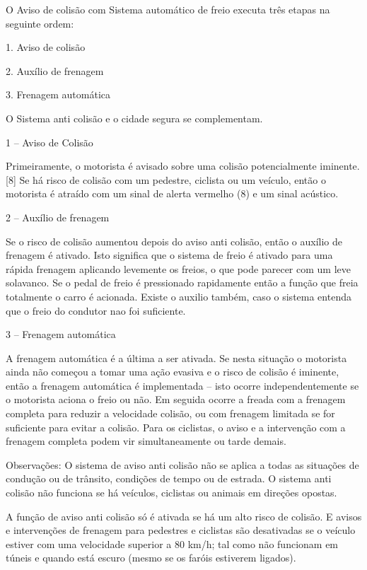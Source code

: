 O Aviso de colisão com Sistema automático de freio executa três etapas na seguinte ordem:

1. Aviso de colisão

2. Auxílio de frenagem

3. Frenagem automática

O Sistema anti colisão e o cidade segura se complementam.

1 – Aviso de Colisão

Primeiramente, o motorista é avisado sobre uma colisão potencialmente iminente.
[8] Se há risco de colisão com um pedestre, ciclista ou um veículo, então o
motorista é atraído com um sinal de alerta vermelho (8) e um sinal acústico. \cite{8comper}

2 – Auxílio de frenagem

Se o risco de colisão aumentou depois do aviso anti colisão, então o auxílio de
frenagem é ativado. Isto significa que o sistema de freio é ativado para uma
rápida frenagem aplicando levemente os freios, o que pode parecer com um leve
solavanco. Se o pedal de freio é pressionado rapidamente então a função que
freia totalmente o carro é acionada. Existe o auxilio também, caso o sistema
entenda que o freio do condutor nao foi suficiente. \cite{8comper}

3 – Frenagem automática

A frenagem automática é a última a ser ativada. Se nesta situação o motorista
ainda não começou a tomar uma ação evasiva e o risco de colisão é iminente,
então a frenagem automática é implementada – isto ocorre independentemente se
o motorista aciona o freio ou não. Em seguida ocorre a freada com a frenagem
completa para reduzir a velocidade colisão, ou com frenagem limitada se for
suficiente para evitar a colisão. Para os ciclistas, o aviso e a intervenção
com a frenagem completa podem vir simultaneamente ou tarde demais. \cite{8comper}

Observações: O sistema de aviso anti colisão não se aplica a todas as
situações de condução ou de trânsito, condições de tempo ou de estrada.
O sistema anti colisão não funciona se há veículos, ciclistas ou animais
em direções opostas.

A função de aviso anti colisão só é ativada se há um alto risco de colisão.
E avisos e intervenções de frenagem para pedestres e ciclistas são desativadas
se o veículo estiver com uma velocidade superior a 80 km/h; tal como não
funcionam em túneis e quando está escuro (mesmo se os faróis estiverem ligados).

